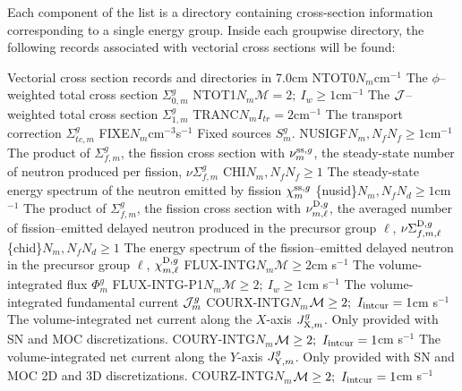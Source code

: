 Each component of the list  is a directory containing cross-section information
corresponding to a single energy group. Inside each groupwise directory, the following
records associated with vectorial cross sections will be found:

\begin{DescriptionEnregistrement}{Vectorial cross section records and directories in
}{7.0cm}
\label{tabl:tabnonlegendre}
\RealEnr
  {NTOT0}{$N_{m}$}{cm$^{-1}$}
  {The $\phi$--weighted total cross section $\Sigma_{0,m}^{g}$}
\OptRealEnr
  {NTOT1}{$N_{m}$}{$\mathcal{M}=2; \ I_{w}\ge 1$}{cm$^{-1}$}
  {The ${\cal J}$--weighted total cross section $\Sigma_{1,m}^{g}$}
\OptRealEnr
  {TRANC}{$N_{m}$}{$I_{tr}=2$}{cm$^{-1}$} 
  {The transport correction $\Sigma_{tc,m}^{g}$}
\RealEnr
  {FIXE}{$N_{m}$}{cm$^{-3}$s$^{-1}$}
  {Fixed sources $S_{m}^{g}$.}
\OptRealEnr
  {NUSIGF}{$N_{m},N_{f}$}{$N_{f}\ge 1$}{cm$^{-1}$} 
  {The product of $\Sigma_{f,m}^{g}$, the fission cross section with
   $\nu_{m}^{{\rm ss},g}$, the steady-state number of neutron produced per fission,
   $\nu\Sigma_{f,m}^{g}$}
\OptRealEnr
  {CHI}{$N_{m},N_{f}$}{$N_{f}\ge 1$}{}
  {The steady-state energy spectrum of the neutron emitted by fission $\chi_{m}^{{\rm ss},g}$}
\OptRealVar
  {\{nusid\}}{$N_{m},N_{f}$}{$N_{d}\ge 1$}{cm$^{-1}$} 
  {The product of $\Sigma_{f,m}^{g}$, the fission cross section with
   $\nu_{m,\ell}^{{\rm D},g}$, the averaged number of fission--emitted delayed
   neutron produced in the precursor group $\ell$,
   $\nu\Sigma_{f,m,\ell}^{{\rm D},g}$}
\OptRealVar
  {\{chid\}}{$N_{m},N_{f}$}{$N_{d}\ge 1$}{}
  {The energy spectrum of the fission--emitted delayed neutron
  in the precursor group $\ell$, $\chi_{m,\ell}^{{\rm D},g}$}
\OptRealEnr
  {FLUX-INTG}{$N_{m}$}{$\mathcal{M}\ge 2$}{cm s$^{-1}$}  
  {The volume-integrated flux $\Phi_{m}^{g}$}
\OptRealEnr
  {FLUX-INTG-P1}{$N_{m}$}{$\mathcal{M}\ge 2; \ I_{w}\ge 1$}{cm s$^{-1}$}  
  {The volume-integrated fundamental current ${\cal J}_{m}^{g}$}
\OptRealEnr
  {COURX-INTG}{$N_{m}$}{$\mathcal{M}\ge 2; \ I_{\rm intcur}=1$}{cm s$^{-1}$}  
  {The volume-integrated net current along the $X$-axis $J_{{\rm X},m}^{g}$. Only provided
  with SN and MOC discretizations.}
\OptRealEnr
  {COURY-INTG}{$N_{m}$}{$\mathcal{M}\ge 2; \ I_{\rm intcur}=1$}{cm s$^{-1}$}  
  {The volume-integrated net current along the $Y$-axis $J_{{\rm Y},m}^{g}$. Only provided
  with SN and MOC 2D and 3D discretizations.}
\OptRealEnr
  {COURZ-INTG}{$N_{m}$}{$\mathcal{M}\ge 2; \ I_{\rm intcur}=1$}{cm s$^{-1}$}  

\end{DescriptionEnregistrement}
